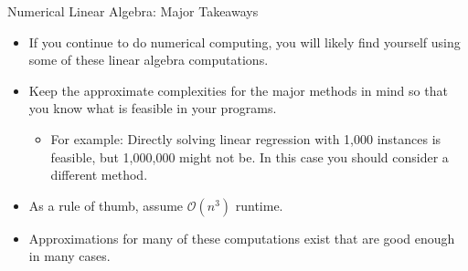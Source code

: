 \documentclass[serif,xcolor=pdftex,dvipsnames,table,hyperref={bookmarks=false,breaklinks}]{beamer}
\begin{document}
\begin{frame}[t]{Numerical Linear Algebra: Major Takeaways}
	\begin{itemize}[<+->]
		\item If you continue to do numerical computing, you will likely find yourself using some of these linear algebra computations.
		\item Keep the approximate complexities for the major methods in mind so that you know what is feasible in your programs.
		\begin{itemize}[<+->]
			\item For example: Directly solving linear regression with 1,000 instances is feasible, but 1,000,000 might not be. In this case you should consider a different method.
		\end{itemize}
		\item As a rule of thumb, assume $\mathcal{O}(n^3)$ runtime.
		\item Approximations for many of these computations exist that are good enough in many cases.
	\end{itemize}
\end{frame}

%

\end{document}
